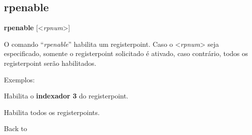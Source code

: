 \documentclass[letterpaper,10pt,brazil]{sphinxmanual}
\begin{document}
\subsection{rpenable}
\label{debugger/registerpoints:debugger-command-rpenable}\label{debugger/registerpoints:rpenable}
\begin{DUlineblock}{0em}
\item[]
\begin{DUlineblock}{\DUlineblockindent}
\item[] \textbf{rpenable} {[}\textless{}\emph{rpnum}\textgreater{}{]}
\item[] 
\end{DUlineblock}
\item[] O comando ``\emph{rpenable}'' habilita um registerpoint. Caso o \textless{}\emph{rpnum}\textgreater{} seja especificado, somente o registerpoint solicitado é ativado, caso contrário, todos os registerpoint serão habilitados.
\item[] 
\item[] Exemplos:
\item[] 
\item[]
\begin{DUlineblock}{\DUlineblockindent}
\item[] 
\item[] 
\end{DUlineblock}
\item[] Habilita o \textbf{indexador 3} do registerpoint.
\item[] 
\item[]
\begin{DUlineblock}{\DUlineblockindent}
\item[] 
\item[] 
\end{DUlineblock}
\item[] Habilita todos os registerpoints.
\item[] 
\item[] Back to {\hyperref[debugger/registerpoints:debugger\string-registerpoints\string-list]{}}
\end{DUlineblock}
\begin{quote}
\label{debugger/registerpoints:debugger-command-rplist}\end{quote}
\end{document}
